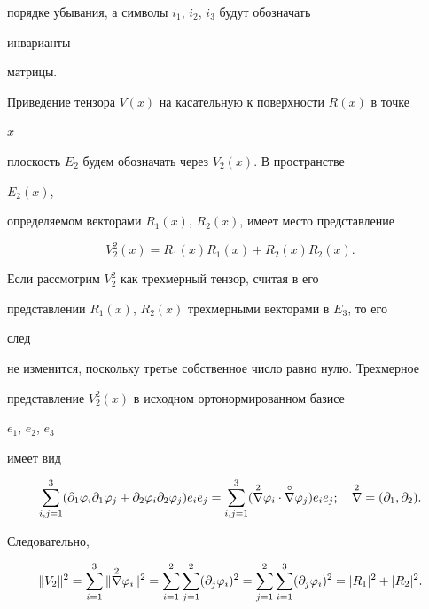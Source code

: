 порядке убывания, а символы $i_1$, $i_2$, $i_3$ будут обозначать


инварианты


матрицы.





Приведение тензора $V(x)$ на касательную к поверхности $R(x)$ в точке


$x$


плоскость $E_2$ будем обозначать через $V_2(x)$. В пространстве


$E_2(x)$,


определяемом векторами $R_1(x)$, $R_2(x)$, имеет место представление


\begin{equation}


V^2_2(x)=R_1(x)R_1(x)+R_2(x)R_2(x).


\end{equation}


Если рассмотрим $V^2_2$ как трехмерный тензор, считая в его


представлении $R_1(x)$, $R_2(x)$ трехмерными векторами в $E_3$, то его


след


не изменится, поскольку третье собственное число равно нулю. Трехмерное


представление $V^2_2(x)$ в исходном ортонормированном базисе


$e_1$, $e_2$, $e_3$


имеет вид


$$


\sum^3_{i,j=1}(\partial_1\varphi_i\partial_1\varphi_j


+\partial_2\varphi_i\partial_2\varphi_j)e_ie_j=


\sum^3_{i,j=1}(\up{2}{\nabla}\varphi_i\cdot


\up{\circ}{\nabla}\varphi_j)e_ie_j;\quad


\up{2}{\nabla}=(\partial_1,\partial_2).


$$


Следовательно,


\begin{equation}


\|V_2\|^2=\sum^3_{i=1}\|\up{2}{\nabla}\varphi_i\|^2=


\sum^2_{i=1}\sum^2_{j=1}(\partial_j\varphi_i)^2=


\sum^2_{j=1}\sum^3_{i=1}(\partial_j\varphi_i)^2=


|R_1|^2+|R_2|^2.


\end{equation}


